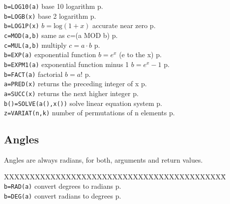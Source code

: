 \begin{tabbing}
\verb|b=LOG10(a)|	\> base 10 logarithm \> p.\pageref{LOG10}\\
\verb|b=LOGB(x)|	\> base 2 logarithm \> p.\pageref{LOGB}\\
\verb|b=LOG1P(x)|	\> $b=\mathrm{log}(1+x)$ accurate near zero\> p.\pageref{LOG1P}\\
\verb|c=MOD(a,b)|	\> same as c=(a MOD b)\> p.\pageref{MOD}\\
\verb|c=MUL(a,b)|	\> multiply $c=a\cdot b$\> p.\pageref{MUL}\\
\verb|b=EXP(a)|		\> exponential function $b=e^x$ (e to the x) \> p.\pageref{EXP}\\
\verb|b=EXPM1(a)|	\> exponential function minus 1 $b=e^x-1$  \> p.\pageref{EXPM1}\\
\verb|b=FACT(a)|	\> factorial $b=a!$\> p.\pageref{FACT}\\
\verb|a=PRED(x)|	\>  returns the preceding integer of x \> p.\pageref{PRED}\\
\verb|a=SUCC(x)|	\>  returns the next higher integer \> p.\pageref{SUCC}\\
\verb|b()=SOLVE(a(),x())|\> solve linear equation system\> p.\pageref{SOLVE} \\
\verb|z=VARIAT(n,k)| \> number of permutations of n elements \> p.\pageref{VARIAT}\\
\end{tabbing}

\subsection{Angles}
Angles are always radians, for both, arguments and return values.

\begin{tabbing}
XXXXXXXXXXXXXX\=XXXXXXXXXXXXXXXXXXXXXXXXXXXXX\=\kill\\
\verb|b=RAD(a)|	\> convert degrees to radians\> p.\pageref{RAD} \\
\verb|b=DEG(a)|	\> convert radians to degrees\> p.\pageref{DEG}\\
\end{tabbing}


